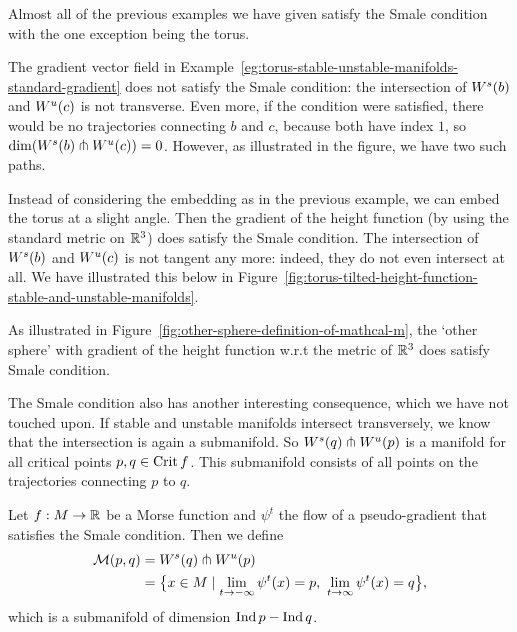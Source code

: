     Almost all of the previous examples we have given satisfy the Smale condition with the one exception being the torus.
    \begin{noneg}
        The gradient vector field in Example~\ref{eg:torus-stable-unstable-manifolds-standard-gradient} does not satisfy the Smale condition: the intersection of $W^s(b)$ and  $W^u(c)$ is not transverse.
        Even more, if the condition were satisfied, there would be no trajectories connecting $b$ and $c$, because both have index $1$, so $\dim (W^s(b) \pitchfork W^u(c)) = 0$. However, as illustrated in the figure, we have two such paths.
    \end{noneg}
    \begin{eg}
        Instead of considering the embedding as in the previous example, we can embed the torus at a slight angle.
        Then the gradient of the height function (by using the standard metric on $\mathbb{R}^3$) does satisfy the Smale condition.
        The intersection of $W^s(b)$ and  $W^u(c)$ is not tangent any more: indeed, they do not even intersect at all. We have illustrated this below in Figure~\ref{fig:torus-tilted-height-function-stable-and-unstable-manifolds}.
    \end{eg}
    \begin{figure}[H]
        \centering
    \end{figure}
    \begin{eg}
        As illustrated in Figure~\ref{fig:other-sphere-definition-of-mathcal-m}, the `other sphere' with gradient of the height function w.r.t the metric of $\mathbb{R}^3$ does satisfy Smale condition.  \end{eg}

The Smale condition also has another interesting consequence, which we have not touched upon.
If stable and unstable manifolds intersect transversely, we know that the intersection is again a submanifold.
So $W^s(q) \pitchfork W^u(p)$ is a manifold for all critical points $p, q \in \operatorname{Crit} f$.
This submanifold consists of all points on the trajectories connecting $p$ to $q$.
 \begin{definition}
    Let $f: M \to  \mathbb{R}$ be a Morse function and $\psi^{t}$ the flow of a pseudo-gradient that satisfies the Smale condition.
    Then we define
    \begin{align*}
        \traj{p}{q} &= \stable{q} \tcap \unstable{p}\\
                    &= \big\{
            x \in M 
            \mid 
            \lim_{t \to -\infty} \psi^{t}(x) = p, \ 
            \lim_{t \to \infty} \psi^{t}(x) = q
        \big\} 
    ,\end{align*} 
    which is a submanifold of dimension $\operatorname{Ind} p - \operatorname{Ind} q$.
\end{definition}

